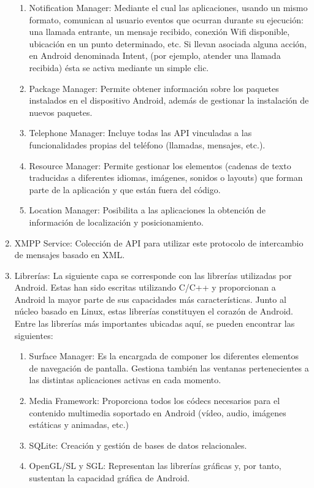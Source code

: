 \begin{enumerate}
\begin{enumerate}
\item	Notification Manager: Mediante el cual las aplicaciones,
 usando un mismo formato, comunican al usuario eventos que
 ocurran durante su ejecución: una llamada entrante, un mensaje recibido,
 conexión Wifi disponible, ubicación en un punto determinado, etc. 
Si llevan asociada alguna acción, en Android denominada Intent,
(por ejemplo, atender una llamada recibida) ésta se activa mediante un simple clic.
\item	Package Manager: Permite obtener información sobre los
 paquetes instalados en el dispositivo Android, además de
 gestionar la instalación de nuevos paquetes.
\item	Telephone Manager: Incluye todas las API vinculadas
 a las funcionalidades propias del teléfono (llamadas, mensajes, etc.).
\item	Resource Manager: Permite gestionar los elementos
 (cadenas de texto traducidas a diferentes idiomas, imágenes, sonidos o layouts)
 que forman parte de la aplicación y que están fuera del código.
\item	Location Manager: Posibilita a las aplicaciones la obtención
 de información de localización y posicionamiento.
\end{enumerate}
\item XMPP Service: Colección de API para utilizar este protocolo
 de intercambio de mensajes basado en XML. 
\item	Librerías: La siguiente capa se corresponde con las librerías
 utilizadas por Android. Estas han sido escritas utilizando C/C++ y
 proporcionan a Android la mayor parte de sus capacidades 
más características. Junto al núcleo basado en Linux, estas librerías 
constituyen el corazón de Android.
Entre las librerías más importantes ubicadas aquí, se pueden
 encontrar las siguientes:
\begin{enumerate}
\item	Surface Manager: Es la encargada de componer los 
diferentes elementos de navegación de pantalla. Gestiona
 también las ventanas pertenecientes a las distintas
 aplicaciones activas en cada momento.
\item	Media Framework: Proporciona todos los códecs necesarios 
para el contenido multimedia soportado en Android (vídeo, audio,
 imágenes estáticas y animadas, etc.)
\item	SQLite: Creación y gestión de bases de datos relacionales.
\item	OpenGL/SL y SGL: Representan las librerías gráficas y,
 por tanto, sustentan la capacidad gráfica de Android.

\end{enumerate}
\end{enumerate}
